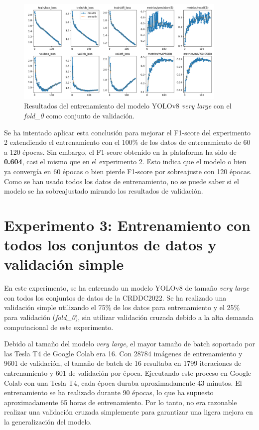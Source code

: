 \begin{figure}[H]
    \centering
    \includegraphics[width=0.9\textwidth]{img/exp2b-results.png}
    \caption{Resultados del entrenamiento del modelo YOLOv8 \textit{very large} con el \textit{fold\_0} como conjunto de validación.}
    \label{fig:exp2b-results}
\end{figure}

Se ha intentado aplicar esta conclusión para mejorar el F1-score del experimento 2 extendiendo el entrenamiento con el 100\% de los datos de entrenamiento de 60 a 120 épocas. Sin embargo, el F1-score obtenido en la plataforma ha sido de \textbf{0.604}, casi el mismo que en el experimento 2. Esto indica que el modelo o bien ya convergía en 60 épocas o bien pierde F1-score por sobreajuste con 120 épocas. Como se han usado todos los datos de entrenamiento, no se puede saber si el modelo se ha sobreajustado mirando los resultados de validación.


\section{Experimento 3: Entrenamiento con todos los conjuntos de datos y validación simple}\label{SEC:EXP3}

En este experimento, se ha entrenado un modelo YOLOv8 de tamaño \textit{very large} con todos los conjuntos de datos de la CRDDC2022. Se ha realizado una validación simple utilizando el 75\% de los datos para entrenamiento y el 25\% para validación (\textit{fold\_0}), sin utilizar validación cruzada debido a la alta demanda computacional de este experimento.

Debido al tamaño del modelo \textit{very large}, el mayor tamaño de batch soportado por las Tesla T4 de Google Colab era 16. Con 28784 imágenes de entrenamiento y 9601 de validación, el tamaño de batch de 16 resultaba en 1799 iteraciones de entrenamiento y 601 de validación por época. Ejecutando este proceso en Google Colab con una Tesla T4, cada época duraba aproximadamente 43 minutos. El entrenamiento se ha realizado durante 90 épocas, lo que ha supuesto aproximadamente 65 horas de entrenamiento. Por lo tanto, no era razonable realizar una validación cruzada simplemente para garantizar una ligera mejora en la generalización del modelo.

